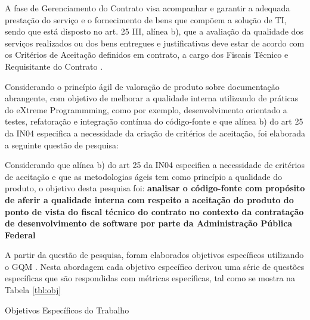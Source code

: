 A fase de Gerenciamento do Contrato visa acompanhar e garantir a adequada prestação do serviço e o fornecimento de bens que compõem a solução de TI, sendo que está disposto no art. 25 III, alínea b), que a avaliação da qualidade dos serviços realizados ou dos bens entregues e justificativas deve estar de acordo com os Critérios de Aceitação definidos em contrato, a cargo dos Fiscais Técnico e Requisitante do Contrato \cite{IN04:2010}.

Considerando o princípio ágil de valoração de produto sobre documentação abrangente, com objetivo de melhorar a qualidade interna utilizando de práticas do eXtreme Programmming, como por exemplo, desenvolvimento orientado a testes, refatoração e integração contínua do código-fonte \cite{beck1999} e que alínea b) do art 25 da IN04 especifica a necessidade da criação de critérios de aceitação, foi elaborada a seguinte questão de pesquisa: 

Considerando que alínea b) do art 25 da IN04 especifica a necessidade de critérios de aceitação e que as metodologias ágeis tem como princípio a qualidade do produto,  o objetivo desta pesquisa foi:
\textbf{analisar o código-fonte
com propósito de aferir a qualidade interna
com respeito a aceitação do produto
do ponto de vista do fiscal técnico do contrato
no contexto da contratação de desenvolvimento de software por parte da Administração Pública Federal
}



A partir da questão de pesquisa, foram elaborados objetivos específicos utilizando o GQM \cite{Basili96b}. Nesta abordagem cada objetivo específico derivou uma série de questões específicas que são respondidas com métricas específicas, tal como se mostra na Tabela \ref{tbl:obj}

\begin{table}[ht]
\centering

\caption{Objetivos Específicos do Trabalho}
\label{tbl:obj} 
\end{table}
\FloatBarrier